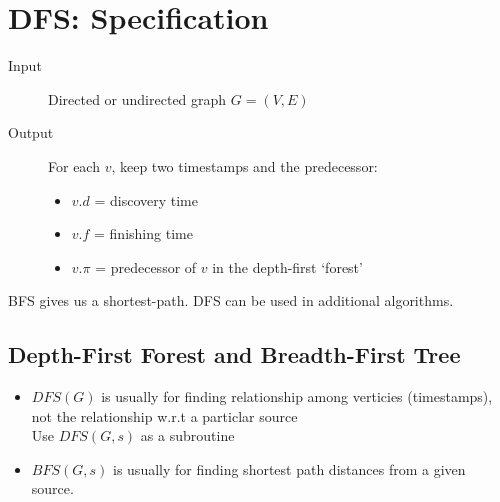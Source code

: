 \documentclass{article}
\begin{document}
\section*{DFS: Specification}

\begin{description}
    \item[Input]  Directed or undirected graph \(G = (V, E)\)
    \item[Output] For each \(v\), keep two timestamps and the predecessor:
        \begin{itemize}
            \item \(v.d\) = discovery time
            \item \(v.f\) = finishing time
            \item \(v.\pi\) = predecessor of \(v\) in the depth-first `forest'
        \end{itemize}
\end{description}

BFS gives us a shortest-path.
DFS can be used in additional algorithms.


\subsection*{Depth-First Forest and Breadth-First Tree}
\begin{itemize}
    \item \(DFS(G)\) is usually for finding relationship among verticies (timestamps), not the relationship w.r.t a particlar source \\
          Use \(DFS(G, s)\) as a subroutine
    \item \(BFS(G, s)\) is usually for finding shortest path distances from a given source.
\end{itemize}
\end{document}
